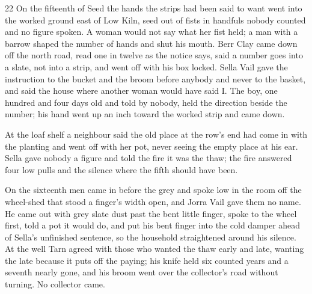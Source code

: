 
\scenebreak


\scenebreak


\scenebreak

\CRtailpiece
\begin{CRchronicle}{22}
On the fifteenth of Seed the hands the strips had been said to want went into the worked ground east of Low Kiln, seed out of fists in handfuls nobody counted and no figure spoken. A woman would not say what her fist held; a man with a barrow shaped the number of hands and shut his mouth. Berr Clay came down off the north road, read one in twelve as the notice says, said a number goes into a slate, not into a strip, and went off with his box locked. Sella Vail gave the instruction to the bucket and the broom before anybody and never to the basket, and said the house where another woman would have said I. The boy, one hundred and four days old and told by nobody, held the direction beside the number; his hand went up an inch toward the worked strip and came down.

At the loaf shelf a neighbour said the old place at the row’s end had come in with the planting and went off with her pot, never seeing the empty place at his ear. Sella gave nobody a figure and told the fire it was the thaw; the fire answered four low pulls and the silence where the fifth should have been.

On the sixteenth men came in before the grey and spoke low in the room off the wheel-shed that stood a finger’s width open, and Jorra Vail gave them no name. He came out with grey slate dust past the bent little finger, spoke to the wheel first, told a pot it would do, and put his bent finger into the cold damper ahead of Sella’s unfinished sentence, so the household straightened around his silence. At the well Tarn agreed with those who wanted the thaw early and late, wanting the late because it puts off the paying; his knife held six counted years and a seventh nearly gone, and his broom went over the collector’s road without turning. No collector came.


\end{CRchronicle}
